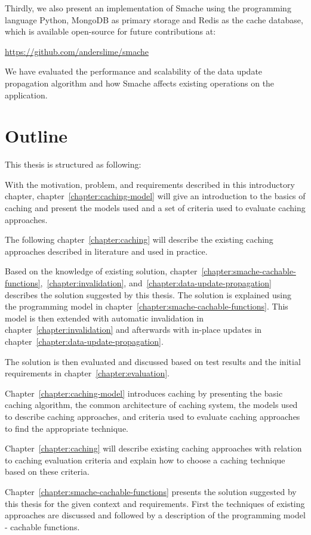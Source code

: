 Thirdly, we also present an implementation of Smache using the programming language Python, MongoDB as primary storage and Redis as the cache database, which is available open-source for future contributions at:

\url{https://github.com/anderslime/smache}

We have evaluated the performance and scalability of the data update propagation algorithm and how Smache affects existing operations on the application.

\section{Outline}
\label{sec:outline}

This thesis is structured as following:

With the motivation, problem, and requirements described in this introductory chapter, chapter~\ref{chapter:caching-model} will give an introduction to the basics of caching and present the models used and a set of criteria used to evaluate caching approaches.

The following chapter~\ref{chapter:caching} will describe the existing caching approaches described in literature and used in practice.

Based on the knowledge of existing solution, chapter~\ref{chapter:smache-cachable-functions},~\ref{chapter:invalidation}, and~\ref{chapter:data-update-propagation} describes the solution suggested by this thesis. The solution is explained using the programming model in chapter~\ref{chapter:smache-cachable-functions}. This model is then extended with automatic invalidation in chapter~\ref{chapter:invalidation} and afterwards with in-place updates in chapter~\ref{chapter:data-update-propagation}.

The solution is then evaluated and discussed based on test results and the initial requirements in chapter~\ref{chapter:evaluation}.

Chapter~\ref{chapter:caching-model} introduces caching by presenting the basic caching algorithm, the common architecture of caching system, the models used to describe caching approaches, and criteria used to evaluate caching approaches to find the appropriate technique.

Chapter~\ref{chapter:caching} will describe existing caching approaches with relation to caching evaluation criteria and explain how to choose a caching technique based on these criteria.

Chapter~\ref{chapter:smache-cachable-functions} presents the solution suggested by this thesis for the given context and requirements. First the techniques of existing approaches are discussed and followed by a description of the programming model - cachable functions.

